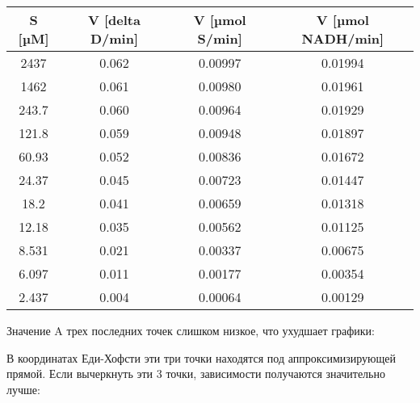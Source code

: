 \begin{tabular}{|c|c|c|c|}
\hline
S [µM] &
V [delta D/min] &
V [µmol S/min] &
V [µmol NADH/min] \\
\hline
2437  & 0.062 &  0.00997 & 0.01994 \\
1462  & 0.061 &  0.00980 & 0.01961 \\
243.7 & 0.060 &  0.00964 & 0.01929 \\
121.8 & 0.059 &  0.00948 & 0.01897 \\
60.93 & 0.052 &  0.00836 & 0.01672 \\
24.37 & 0.045 &  0.00723 & 0.01447 \\
18.2  & 0.041 &  0.00659 & 0.01318 \\
12.18 & 0.035 &  0.00562 & 0.01125 \\
8.531 & 0.021 &  0.00337 & 0.00675 \\
6.097 & 0.011 &  0.00177 & 0.00354 \\
2.437 & 0.004 &  0.00064 & 0.00129 \\
\hline
\end{tabular}

Значение A трех последних точек слишком низкое,
что ухудшает графики:





В координатах Еди-Хофсти эти три точки находятся под аппроксимизирующей прямой.
Если вычеркнуть эти 3 точки, зависимости получаются значительно лучше:









